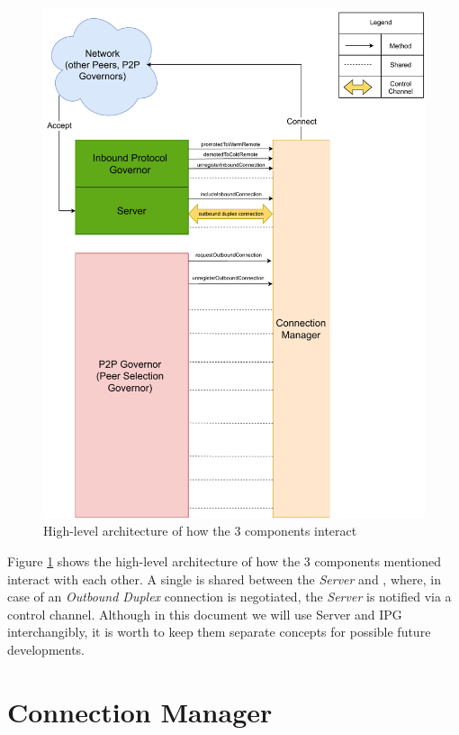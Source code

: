 \begin{figure}
    \centering
    \includegraphics[width=\linewidth]{figure/ConnectionManagerInteractions.pdf}
    \caption{High-level architecture of how the 3 components interact}
    \label{fig:high-level-arch}
\end{figure}

Figure \ref{fig:high-level-arch} shows the high-level architecture of how the 3 components mentioned interact
with each other. A single \Connmngr{} is shared between the \emph{Server} and \ptopgov{},
where, in case of an \emph{Outbound Duplex} connection is negotiated, the \emph{Server} is
notified via a control channel. Although in this document we will use Server and IPG
interchangibly, it is worth to keep them separate concepts for possible future
developments.

\section{Connection Manager}

